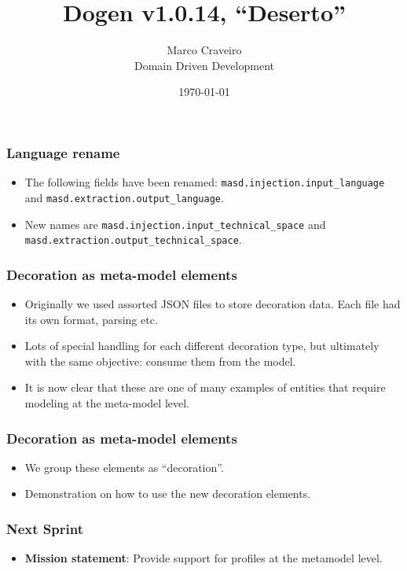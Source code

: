 \documentclass{beamer}
\title{Dogen v1.0.14, \enquote{Deserto}}
\author{Marco Craveiro \\
  Domain Driven Development
}
\date{\today}
\begin{document}
\begin{frame}
\titlepage
\end{frame}

\begin{frame}
\frametitle{Language rename}

\begin{itemize}

  \pause

\item The following fields have been renamed:
  \texttt{masd.injection.input\_language} and
  \texttt{masd.extraction.output\_language}.

  \pause

\item New names are \texttt{masd.injection.input\_technical\_space}
  and \texttt{masd.extraction.output\_technical\_space}.

\end{itemize}

\end{frame}

\begin{frame}
\frametitle{Decoration as meta-model elements}

\begin{itemize}

  \pause

\item Originally we used assorted JSON files to store decoration
  data. Each file had its own format, parsing etc.

  \pause

\item Lots of special handling for each different decoration type,
  but ultimately with the same objective: consume them from the model.

  \pause

\item It is now clear that these are one of many examples of entities
  that require modeling at the meta-model level.

\end{itemize}

\end{frame}

\begin{frame}
\frametitle{Decoration as meta-model elements}

\begin{itemize}

  \pause

\item We group these elements as ``decoration''.

  \pause

\item Demonstration on how to use the new decoration elements.

\end{itemize}

\end{frame}

\begin{frame}
\frametitle{Next Sprint}

\begin{itemize}
\item \textbf{Mission statement}: Provide support for profiles at the
  metamodel level.
\end{itemize}

\end{frame}
\end{document}
